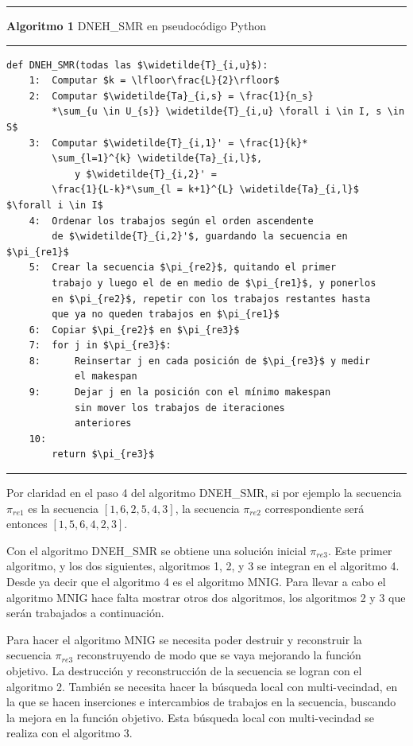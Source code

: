 \documentclass{article}
\begin{document}
\pagebreak

\noindent\noindent
\rule{\linewidth}{0.4pt}

\textbf{Algoritmo 1} DNEH\_SMR en pseudocódigo Python

\noindent\noindent
\rule{\linewidth}{0.4pt}

\begin{lstlisting}[mathescape=true]
    def DNEH_SMR(todas las $\widetilde{T}_{i,u}$):
    1:  Computar $k = \lfloor\frac{L}{2}\rfloor$
    2:  Computar $\widetilde{Ta}_{i,s} = \frac{1}{n_s}
        *\sum_{u \in U_{s}} \widetilde{T}_{i,u} \forall i \in I, s \in S$
    3:  Computar $\widetilde{T}_{i,1}' = \frac{1}{k}*
        \sum_{l=1}^{k} \widetilde{Ta}_{i,l}$, 
            y $\widetilde{T}_{i,2}' = 
        \frac{1}{L-k}*\sum_{l = k+1}^{L} \widetilde{Ta}_{i,l}$ $\forall i \in I$
    4:  Ordenar los trabajos según el orden ascendente 
        de $\widetilde{T}_{i,2}'$, guardando la secuencia en $\pi_{re1}$
    5:  Crear la secuencia $\pi_{re2}$, quitando el primer 
        trabajo y luego el de en medio de $\pi_{re1}$, y ponerlos
        en $\pi_{re2}$, repetir con los trabajos restantes hasta
        que ya no queden trabajos en $\pi_{re1}$
    6:  Copiar $\pi_{re2}$ en $\pi_{re3}$
    7:  for j in $\pi_{re3}$:
    8:      Reinsertar j en cada posición de $\pi_{re3}$ y medir
            el makespan
    9:      Dejar j en la posición con el mínimo makespan
            sin mover los trabajos de iteraciones
            anteriores
    10: 
        return $\pi_{re3}$
\end{lstlisting}

\noindent\noindent
\rule{\textwidth}{0.4pt}

\vspace{\baselineskip}
Por claridad en el paso 4 del algoritmo DNEH\_SMR, si por ejemplo la secuencia $\pi_{re1}$ es la secuencia $[1, 6, 2, 5, 4, 3]$, la secuencia $\pi_{re2}$ correspondiente será entonces $[1, 5, 6, 4, 2, 3]$. \autocite{algMNIG}

\vspace{\baselineskip}
Con el algoritmo DNEH\_SMR se obtiene una solución inicial $\pi_{re3}$. Este primer algoritmo, y los dos siguientes, algoritmos 1, 2, y 3 se integran en el algoritmo 4. Desde ya decir que el algoritmo 4 es el algoritmo MNIG. Para llevar a cabo el algoritmo MNIG hace falta mostrar otros dos algoritmos, los algoritmos 2 y 3 que serán trabajados a continuación.

\vspace{\baselineskip}
Para hacer el algoritmo MNIG se necesita poder destruir y reconstruir la secuencia $\pi_{re3}$ reconstruyendo de modo que se vaya mejorando la función objetivo. La destrucción y reconstrucción de la secuencia se logran con el algoritmo 2. También se necesita hacer la búsqueda local con multi-vecindad, en la que se hacen inserciones e intercambios de trabajos en la secuencia, buscando la mejora en la función objetivo. Esta búsqueda local con multi-vecindad se realiza con el algoritmo 3. \autocite{algMNIG}
\end{document}
